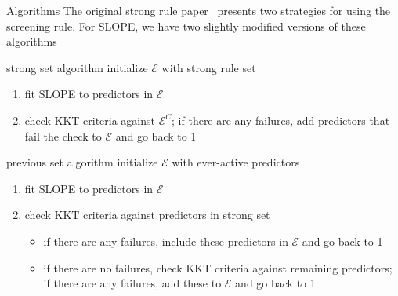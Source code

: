 \documentclass[10pt,ignorenonframetext]{beamer}
\begin{document}
\begin{frame}{Algorithms}
  The original strong rule paper~\autocite{tibshirani2012} presents two
  strategies for using the screening rule.  For SLOPE, we have two \alert{slightly}
  modified versions of these algorithms

  \begin{block}{strong set algorithm}
    initialize \(\mathcal{E}\) with strong rule set
    \begin{enumerate}
      \item fit SLOPE to predictors in \(\mathcal{E}\)
      \item check KKT criteria against \(\mathcal{E}^C\); if there are any failures, add predictors
            that fail the check to \(\mathcal{E}\) and go back to 1
    \end{enumerate}
  \end{block}
  \pause
  \begin{block}{previous set algorithm}
    initialize \(\mathcal{E}\) with ever-active predictors
    \begin{enumerate}
      \item fit SLOPE to predictors in \(\mathcal{E}\)
      \item check KKT criteria against predictors in \alert{strong} set
            \begin{itemize}
              \item if there are any failures, include these predictors in \(\mathcal{E}\) and go back to 1
              \item if there are no failures, check KKT criteria against remaining predictors; if there are any
                    failures, add these to \(\mathcal{E}\) and go back to 1
            \end{itemize}
    \end{enumerate}
  \end{block}
\end{frame}
\end{document}
